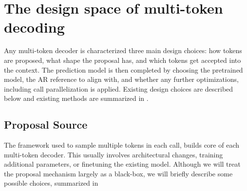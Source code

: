 \documentclass{article} %
\begin{document}
\section{The design space of multi-token decoding}
\label{sec:design}

Any multi-token decoder is characterized three main design choices: how tokens are proposed, what shape the proposal has, and which tokens get accepted into the context. The prediction model is then completed by choosing the pretrained model, the AR reference to align with, and whether any further optimizations, including call parallelization is applied.
Existing design choices are described below and existing methods are summarized in .

\subsection{Proposal Source}
\label{sec:proposal}

The framework used to sample multiple tokens in each call, builds core of each multi-token decoder. This usually involves architectural changes, training additional parameters, or finetuning the existing model. Although we will treat the proposal mechanism largely as a black-box, we will briefly describe some possible choices, summarized in 
\end{document}
